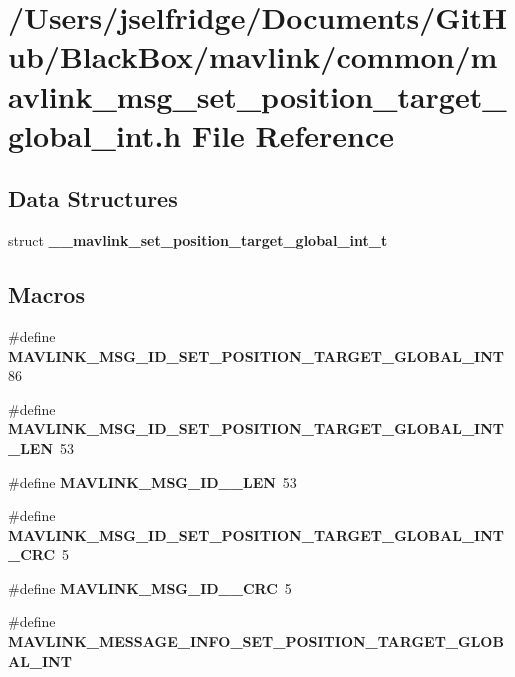 \section{/\+Users/jselfridge/\+Documents/\+Git\+Hub/\+Black\+Box/mavlink/common/mavlink\+\_\+msg\+\_\+set\+\_\+position\+\_\+target\+\_\+global\+\_\+int.h File Reference}
\label{mavlink__msg__set__position__target__global__int_8h}
\subsection*{Data Structures}
\begin{DoxyCompactItemize}
\item 
struct \textbf{ \+\_\+\+\_\+mavlink\+\_\+set\+\_\+position\+\_\+target\+\_\+global\+\_\+int\+\_\+t}
\end{DoxyCompactItemize}
\subsection*{Macros}
\begin{DoxyCompactItemize}
\item 
\#define \textbf{ M\+A\+V\+L\+I\+N\+K\+\_\+\+M\+S\+G\+\_\+\+I\+D\+\_\+\+S\+E\+T\+\_\+\+P\+O\+S\+I\+T\+I\+O\+N\+\_\+\+T\+A\+R\+G\+E\+T\+\_\+\+G\+L\+O\+B\+A\+L\+\_\+\+I\+NT}~86
\item 
\#define \textbf{ M\+A\+V\+L\+I\+N\+K\+\_\+\+M\+S\+G\+\_\+\+I\+D\+\_\+\+S\+E\+T\+\_\+\+P\+O\+S\+I\+T\+I\+O\+N\+\_\+\+T\+A\+R\+G\+E\+T\+\_\+\+G\+L\+O\+B\+A\+L\+\_\+\+I\+N\+T\+\_\+\+L\+EN}~53
\item 
\#define \textbf{ M\+A\+V\+L\+I\+N\+K\+\_\+\+M\+S\+G\+\_\+\+I\+D\+\_\+\_\+\+L\+EN}~53
\item 
\#define \textbf{ M\+A\+V\+L\+I\+N\+K\+\_\+\+M\+S\+G\+\_\+\+I\+D\+\_\+\+S\+E\+T\+\_\+\+P\+O\+S\+I\+T\+I\+O\+N\+\_\+\+T\+A\+R\+G\+E\+T\+\_\+\+G\+L\+O\+B\+A\+L\+\_\+\+I\+N\+T\+\_\+\+C\+RC}~5
\item 
\#define \textbf{ M\+A\+V\+L\+I\+N\+K\+\_\+\+M\+S\+G\+\_\+\+I\+D\+\_\+\_\+\+C\+RC}~5
\item 
\#define \textbf{ M\+A\+V\+L\+I\+N\+K\+\_\+\+M\+E\+S\+S\+A\+G\+E\+\_\+\+I\+N\+F\+O\+\_\+\+S\+E\+T\+\_\+\+P\+O\+S\+I\+T\+I\+O\+N\+\_\+\+T\+A\+R\+G\+E\+T\+\_\+\+G\+L\+O\+B\+A\+L\+\_\+\+I\+NT}
\end{DoxyCompactItemize}
